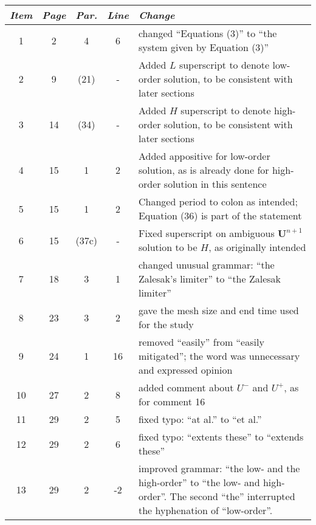 \begin{tabular}{c c c c p{3in}}
\emph{Item} & \emph{Page} & \emph{Par.} & \emph{Line} & \emph{Change}\\\hline
1 & 2 & 4 & 6 & changed ``Equations (3)'' to ``the system given by Equation (3)''\\
2 & 9  & (21) & - & Added $L$ superscript to denote low-order solution, to be consistent with later sections\\
3 & 14 & (34) & - & Added $H$ superscript to denote high-order solution, to be consistent with later sections\\
4 & 15 & 1 & 2 & Added appositive for low-order solution, as is already done for high-order solution in this sentence\\
5 & 15 & 1 & 2 & Changed period to colon as intended; Equation (36) is part of the statement\\
6 & 15 & (37c) & - & Fixed superscript on ambiguous $\mathbf{U}^{n+1}$ solution to be $H$, as originally intended\\
7 & 18 & 3 & 1 & changed unusual grammar: ``the Zalesak's limiter'' to ``the Zalesak limiter''\\
8 & 23 & 3 & 2 & gave the mesh size and end time used for the study\\
9 & 24 & 1 & 16 & removed ``easily'' from ``easily mitigated''; the word was unnecessary and expressed opinion\\
10 & 27 & 2 & 8 & added comment about $U^-$ and $U^+$, as for comment 16\\
11 & 29 & 2 & 5 & fixed typo: ``at al.'' to ``et al.''\\
12 & 29 & 2 & 6 & fixed typo: ``extents these'' to ``extends these''\\
13 & 29 & 2 & -2 & improved grammar: ``the low- and the high-order'' to ``the low- and high-order''.
  The second ``the'' interrupted the hyphenation of ``low-order''.\\
\end{tabular}


